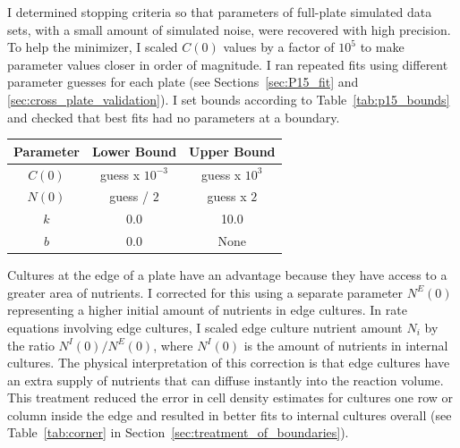 I determined stopping criteria so that parameters of full-plate
simulated data sets, with a small amount of simulated noise, were
recovered with high precision. To help the minimizer, I scaled
\(C(0)\) values by a factor of \(10^{5}\) to make parameter values
closer in order of magnitude. I ran repeated fits using different
parameter guesses for each plate (see Sections~\ref{sec:P15_fit} and
\ref{sec:cross_plate_validation}). I set bounds according to
Table~\ref{tab:p15_bounds} and checked that best fits had no
parameters at a boundary.
%
\begin{center}
  \begin{tabular}{| c | c c |}
    \hline
    Parameter        & Lower Bound  & Upper Bound \\
    \hline
    \(C(0)\)     & guess x \(10^{-3}\)  & guess x \(10^{3}\)\\
    \(N(0)\)     & guess / \(2\)  & guess x \(2\)\\
    \(k\)        & 0.0    & 10.0\\
    \(b\)           & 0.0    & None \\
    \hline
  \end{tabular}
  \label{tab:p15_bounds}
\end{center}
%
Cultures at the edge of a plate have an advantage because they have
access to a greater area of nutrients. I corrected for this using a
separate parameter \(N^{E}(0)\) representing a higher initial amount
of nutrients in edge cultures. In rate equations involving edge
cultures, I scaled edge culture nutrient amount \(N_{i}\) by the ratio
\(N^{I}(0)/N^{E}(0)\), where \(N^{I}(0)\) is the amount of nutrients
in internal cultures. The physical interpretation of this correction
is that edge cultures have an extra supply of nutrients that can
diffuse instantly into the reaction volume. This treatment reduced the
error in cell density estimates for cultures one row or column inside
the edge and resulted in better fits to internal cultures overall (see
Table~\ref{tab:corner} in
Section~\ref{sec:treatment_of_boundaries}).

